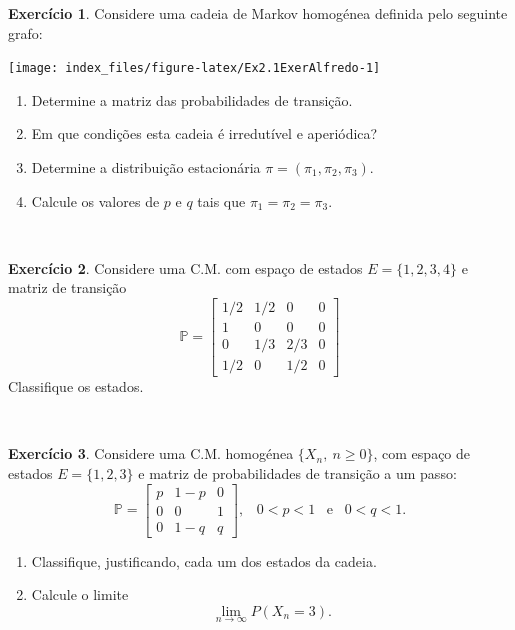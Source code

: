 \documentclass[
  11pt,
  a4paper,
]{book}
\theoremstyle{definition}
\theoremstyle{definition}
\theoremstyle{definition}
\newtheorem{exercise}{Exercício}[chapter]
\theoremstyle{definition}
\theoremstyle{remark}
\begin{document}
\begin{exercise}
\leavevmode

Considere uma cadeia de Markov homogénea definida pelo seguinte grafo:

\begin{center}\texttt{[image: index\_files/figure-latex/Ex2.1ExerAlfredo-1]} \end{center}

\begin{enumerate}
\def\labelenumi{(\alph{enumi})}
\item
  Determine a matriz das probabilidades de transição.
\item
  Em que condições esta cadeia é irredutível e aperiódica?
\item
  Determine a distribuição estacionária \(\pi=(\pi _{1},\pi _{2},\pi _{3})\).
\item
  Calcule os valores de \(p\) e \(q\) tais que \(\pi _{1}=\pi _{2}=\pi _{3}\).
\end{enumerate}

\end{exercise}

\(\,\)

\begin{exercise}
\leavevmode

Considere uma C.M. com espaço de estados \(E=\{1,2,3,4\}\) e matriz de transição
\[
\mathbb{P}=\left[
\begin{array}{cccc}
1/2 & 1/2 & 0 & 0 \\
1 & 0 & 0 & 0 \\
0 & 1/3 & 2/3 & 0 \\
1/2 & 0 & 1/2 & 0%
\end{array}
\right]
\]
Classifique os estados.

\end{exercise}

\(\,\)

\begin{exercise}
\leavevmode

Considere uma C.M. homogénea \(\{X_{n}, ~ n\geq 0\}\), com espaço de estados \(E=\{1,2,3\}\) e matriz de probabilidades de transição a um passo:
\[
\mathbb{P}=\left[
\begin{array}{ccc}
p & 1-p & 0 \\
0 & 0 & 1 \\
0 & 1-q & q%
\end{array}
\right] ,\;\;\;0<p<1\;\;\;\mathrm{e}\;\;\;0<q<1.
\]

\begin{enumerate}
\def\labelenumi{(\alph{enumi})}
\item
  Classifique, justificando, cada um dos estados da cadeia.
\item
  Calcule o limite
  \[\lim\limits_{n \to \infty }P(X_{n}=3).\]
\end{enumerate}

\end{exercise}
\end{document}

